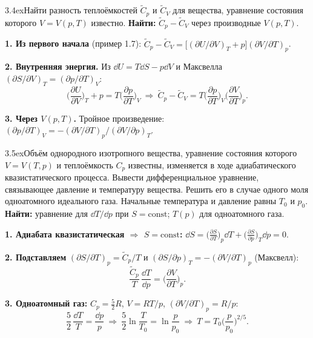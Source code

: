 \begin{problem}{3.4}{ex}{Найти разность теплоёмкостей $\widetilde C_p$ и $\widetilde C_V$ для вещества, уравнение состояния которого
$V=V(p,T)$ известно.}
\textbf{Найти:} $\widetilde C_p-\widetilde C_V$ через производные $V(p,T)$.

\textbf{1. Из первого начала} (пример 1.7): $\widetilde C_p-\widetilde C_V=\big[(\partial U/\partial V)_T+p\big](\partial V/\partial T)_p$.

\textbf{2. Внутренняя энергия.} Из $\dd U=T\dd S-p\dd V$ и Максвелла $(\partial S/\partial V)_T=(\partial p/\partial T)_V$:
\[\Big(\frac{\partial U}{\partial V}\Big)_T+p=T\Big(\frac{\partial p}{\partial T}\Big)_V
\ \Rightarrow\ \widetilde C_p-\widetilde C_V=T\Big(\frac{\partial p}{\partial T}\Big)_V\Big(\frac{\partial V}{\partial T}\Big)_p.\]

\textbf{3. Через $V(p,T)$.} Тройное произведение: $(\partial p/\partial T)_V=-(\partial V/\partial T)_p\big/(\partial V/\partial p)_T$.
\end{problem}

\begin{problem}{3.5}{ex}{Объём однородного изотропного вещества, уравнение состояния которого $V=V(T,p)$ и теплоёмкость $C_p$ известны,
изменяется в ходе адиабатического квазистатического процесса. Вывести дифференциальное уравнение, связывающее давление и температуру
вещества. Решить его в случае одного моля одноатомного идеального газа. Начальные температура и давление равны $T_0$ и $p_0$.}
\textbf{Найти:} уравнение для $\dd T/\dd p$ при $S=\mathrm{const}$; $T(p)$ для одноатомного газа.

\textbf{1. Адиабата квазистатическая $\Rightarrow$ $S=\mathrm{const}$:}
$\dd S=\big(\frac{\partial S}{\partial T}\big)_p\dd T+\big(\frac{\partial S}{\partial p}\big)_T\dd p=0$.

\textbf{2. Подставляем} $(\partial S/\partial T)_p=\widetilde C_p/T$ и $(\partial S/\partial p)_T=-(\partial V/\partial T)_p$ (Максвелл):
\[\frac{\widetilde C_p}{T}\,\frac{\dd T}{\dd p}=\Big(\frac{\partial V}{\partial T}\Big)_p.\]

\textbf{3. Одноатомный газ:} $C_p=\frac52R$, $V=RT/p$, $(\partial V/\partial T)_p=R/p$:
\[\frac52\,\frac{\dd T}{T}=\frac{\dd p}{p}\ \Rightarrow\ \frac52\ln\frac T{T_0}=\ln\frac p{p_0}\ \Rightarrow\ T=T_0\Big(\frac p{p_0}\Big)^{2/5}.\]
\end{problem}

